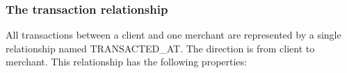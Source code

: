 



\subsubsection{The transaction relationship}
All transactions between a client and one merchant are represented by a single relationship named TRANSACTED\_AT.  The direction is from client to merchant.  This relationship has the following properties:


